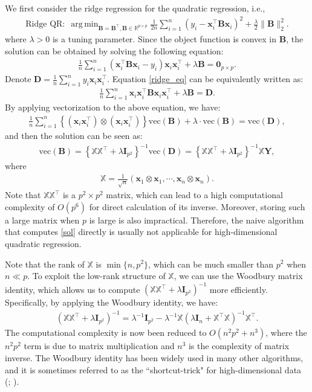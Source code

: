 \documentclass[preprint,authoryear,11pt]{elsarticle}
\def\mR{\mathbb{R}}
\def\wvec{\mbox{vec}}
\newcommand{\bI}{\mathbf I}
\newcommand{\bzero}{\mathbf 0}
\newcommand{\B}{\mathbf B}
\newcommand{\Y}{\mathbf Y}
\newcommand{\x}{\mathbf x}
\newcommand{\aD}{\mathbf D}
\newcommand{\cX}{\mathbb {X}}
\newcommand{\trans}{^\top}
\DeclareMathOperator*{\argmin}{arg\,min} %
\begin{document}
We first consider the ridge regression for the quadratic regression, i.e., 
\begin{align}\label{RidgeQR}
\mbox{Ridge QR:}~~\argmin_{\B=\B^\top, \B \in \mR^{p \times p}} \frac{1}{2n} \sum_{i=1}^n (y_i-\x_i\trans \B \x_i)^2+\frac{\lambda }{2} \|\B\|_2^2.
\end{align}
where $\lambda>0$ is a tuning parameter.
Since the object function is convex in $\B$, the solution can be obtained by solving the following equation:
\begin{align}\label{ridge_eq}
\frac{1}{n} \sum_{i=1}^n (\x_i\trans \B \x_i-y_i) \x_i \x_i \trans +\lambda  \B=\bzero_{p \times p}.
\end{align}
Denote
$ \aD=\frac{1}{n} \sum_{i=1}^n y_i \x_i \x_i \trans$. 
Equation \eqref{ridge_eq} can be equivalently written as: 
\begin{align*}
	\frac{1}{n} \sum_{i=1}^n \x_i \x_i\trans \B \x_i \x_i\trans+\lambda  \B=\aD. 
\end{align*}
By applying vectorization to the above equation, we have:
\begin{align*}
	\frac{1}{n} \sum_{i=1}^n \left\{ (\x_i \x_i\trans) \otimes (\x_i \x_i\trans) \right\} \wvec(\B)+\lambda \cdot \wvec(\B)=\wvec(\aD),
\end{align*}
and then the solution can be seen as:
\begin{align} \label{sol}
	\wvec(\B)= \left\{\cX \cX \trans+\lambda  \bI_{p^2} \right\}^{-1} \wvec(\aD)=\left\{\cX \cX \trans+\lambda   \bI_{p^2} \right\}^{-1} \cX  \Y,
\end{align}
where 
\begin{align*}
	\cX	=\frac{1}{\sqrt{n}} (\x_1 \otimes \x_1,\cdots,\x_n \otimes \x_n).
\end{align*}
Note that $\cX \cX \trans$ is a $p^2 \times p^2$ matrix, which can lead to a high computational complexity of $O(p^6)$ for direct calculation of its inverse. Moreover, storing such a large matrix when $p$ is large is also impractical.  Therefore, the naive algorithm that computes \eqref{sol} directly is usually not applicable for high-dimensional quadratic regression.  

 

Note that the rank of $\cX$ is $\min\{n,p^2\}$, which can be much smaller than $p^2$ when $n \ll p$. To exploit the low-rank structure of $\cX$, we can use the Woodbury matrix identity, which allows us to compute $(\cX \cX \trans + \lambda  \bI_{p^2})^{-1}$ more efficiently. Specifically, by applying the Woodbury identity,
we have:
\begin{align} \label{wood}
	(\cX \cX \trans+\lambda   \bI_{p^2})^{-1}=\lambda ^{-1}\bI_{p^2}-\lambda ^{-1} \cX (\lambda \bI_n+\cX\trans \cX)^{-1} \cX \trans.
\end{align}
The computational complexity is now been reduced to $O(n^2p^2+n^3)$, where the $n^2p^2$ term is due to matrix multiplication and $n^3$ is the complexity of matrix inverse. The Woodbury identity has been widely used in many other algorithms, and it is sometimes referred to as the ``shortcut-trick" for high-dimensional data (\citep[section 4.2.4]{boyd2011distributed}; \citealt{friedman2001elements}).
\end{document}
